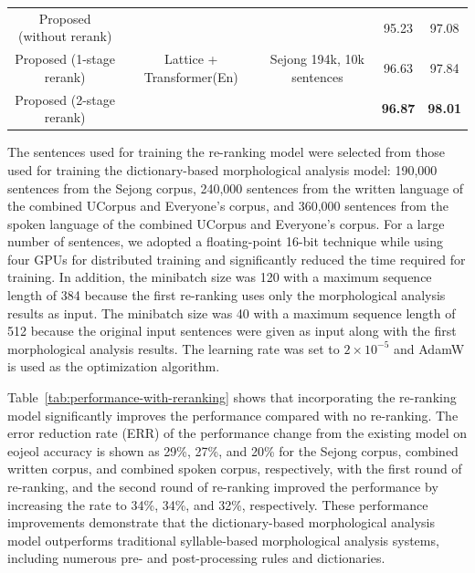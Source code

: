 \documentclass[AMS,STIX2COL]{WileyNJD-v2}
\begin{document}
\begin{table}[]
\begin{tabular*}{500pt}{@{\extracolsep\fill}ccc|cc@{\extracolsep\fill}}
            \midrule
            Proposed (without rerank)             & \multirow{3}{*}{Lattice + Transformer(En)} & \multirow{3}{*}{Sejong 194k, 10k sentences} & 95.23                      & 97.08                        \\
            Proposed (1-stage rerank)             & ~                                          & ~                                           & 96.63                      & 97.84                        \\
            Proposed (2-stage rerank)             & ~                                          & ~                                           & \textbf{96.87}             & \textbf{98.01}               \\
            \bottomrule
        \end{tabular*}
    \end{table}

    The sentences used for training the re-ranking model were selected from those used for training the dictionary-based morphological analysis model: 190,000 sentences from the Sejong corpus, 240,000 sentences from the written language of the combined UCorpus and Everyone's corpus, and 360,000 sentences from the spoken language of the combined UCorpus and Everyone's corpus.
    For a large number of sentences, we adopted a floating-point 16-bit technique while using four GPUs for distributed training and significantly reduced the time required for training.
    In addition, the minibatch size was 120 with a maximum sequence length of 384 because the first re-ranking uses only the morphological analysis results as input.
    The minibatch size was 40 with a maximum sequence length of 512 because the original input sentences were given as input along with the first morphological analysis results.
    The learning rate was set to $2 \times 10^{-5}$ and AdamW is used as the optimization algorithm.

    Table~\ref{tab:performance-with-reranking} shows that incorporating the re-ranking model significantly improves the performance compared with no re-ranking.
    The error reduction rate (ERR) of the performance change from the existing model on eojeol accuracy is shown as 29\%, 27\%, and 20\% for the Sejong corpus, combined written corpus, and combined spoken corpus, respectively, with the first round of re-ranking, and the second round of re-ranking improved the performance by increasing the rate to 34\%, 34\%, and 32\%, respectively.
    These performance improvements demonstrate that the dictionary-based morphological analysis model outperforms traditional syllable-based morphological analysis systems, including numerous pre- and post-processing rules and dictionaries.
\end{document}
